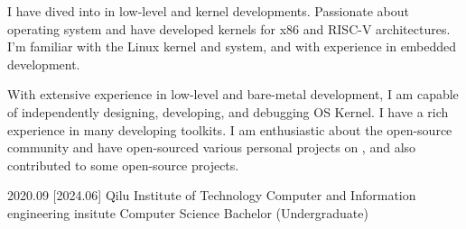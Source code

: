 \documentclass{resume}
\begin{document}
\makeheader

{\onehalfspacing
\hspace{2em}
I have dived into in low-level and kernel developments. Passionate about operating system and have developed kernels for x86 and RISC-V architectures. 
I'm familiar with the Linux kernel and system, and with experience in embedded development.

\onehalfspacing
\hspace{2em}
With extensive experience in low-level and bare-metal development, I am capable of independently designing, developing, and debugging OS Kernel. I have a rich experience in many developing toolkits.
I am enthusiastic about the open-source community and have open-sourced various personal projects on , and also contributed to some open-source projects.
\par}


\begin{competences}[7em]
\end{competences}

\begin{educations}
  \education%
    {2020.09}%
    [2024.06]%
    {Qilu Institute of Technology}%
    {Computer and Information engineering insitute}%
    {Computer Science}%
    {Bachelor (Undergraduate)}
\end{educations}
\end{document}
